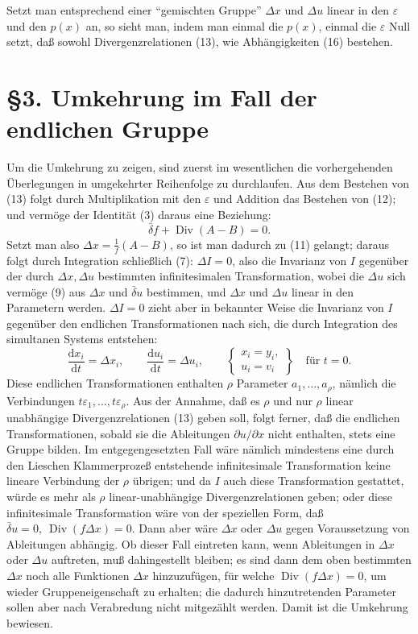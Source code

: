 \documentclass[11pt]{article}
\newcommand{\dd}{\mathrm d}
\newcommand{\Div}{\operatorname{Div}}
\newcommand{\D}{\Delta}
\newcommand{\bd}{\bar{\delta}}
\newcommand{\eps}{\varepsilon}
\newcommand{\p}{\partial}
\begin{document}
Setzt man entsprechend einer ``gemischten Gruppe'' \(\D x\) und \(\D u\) linear in den \(\eps\) und den \(p(x)\) an, so sieht man, indem man einmal die \(p(x)\), einmal die \(\eps\) Null setzt, daß sowohl Divergenzrelationen (13), wie Abhängigkeiten (16) bestehen.

\section*{\S{}3. Umkehrung im Fall der endlichen Gruppe}

Um die Umkehrung zu zeigen, sind zuerst im wesentlichen die vorhergehenden Überlegungen in umgekehrter Reihenfolge zu durchlaufen. Aus dem Bestehen von (13) folgt durch Multiplikation mit den \(\eps\) und Addition das Bestehen von (12); und vermöge der Identität (3) daraus eine Beziehung:
\[
\bd f+\Div(A-B)=0.
\]
Setzt man also \(\D x=\frac{1}{f}(A-B)\), so ist man dadurch zu (11) gelangt; daraus folgt durch Integration schließlich (7): \(\D I=0\), also die Invarianz von \(I\) gegenüber der durch \(\D x,\D u\) bestimmten infinitesimalen Transformation, wobei die \(\D u\) sich vermöge (9) aus \(\D x\) und \(\bd u\) bestimmen, und \(\D x\) und \(\D u\) linear in den Parametern werden. \(\D I=0\) zieht aber in bekannter Weise die Invarianz von \(I\) gegenüber den endlichen Transformationen nach sich, die durch Integration des simultanen Systems entstehen:
\begin{equation}
\frac{\dd x_i}{\dd t}=\D x_i,\qquad
\frac{\dd u_i}{\dd t}=\D u_i,\qquad
\left\{\begin{array}{l}
x_i=y_i,\\
u_i=v_i
\end{array}\right\}
\quad\text{für }t=0.
\tag{17}
\end{equation}
Diese endlichen Transformationen enthalten \(\rho\) Parameter \(a_1,\ldots,a_\rho\), nämlich die Verbindungen \(t\eps_1,\ldots,t\eps_\rho\). Aus der Annahme, daß es \(\rho\) und nur \(\rho\) linear unabhängige Divergenzrelationen (13) geben soll, folgt ferner, daß die endlichen Transformationen, sobald sie die Ableitungen \(\p u/\p x\) nicht enthalten, stets eine Gruppe bilden. Im entgegengesetzten Fall wäre nämlich mindestens eine durch den Lieschen Klammerprozeß entstehende infinitesimale Transformation keine lineare Verbindung der \(\rho\) übrigen; und da \(I\) auch diese Transformation gestattet, würde es mehr als \(\rho\) linear-unabhängige Divergenzrelationen geben; oder diese infinitesimale Transformation wäre von der speziellen Form, daß \(\bd u=0,\ \Div(f\D x)=0\). Dann aber wäre \(\D x\) oder \(\D u\) gegen Voraussetzung von Ableitungen abhängig. Ob dieser Fall eintreten kann, wenn Ableitungen in \(\D x\) oder \(\D u\) auftreten, muß dahingestellt bleiben; es sind dann dem oben bestimmten \(\D x\) noch alle Funktionen \(\D x\) hinzuzufügen, für welche \(\Div(f\D x)=0\), um wieder Gruppeneigenschaft zu erhalten; die dadurch hinzutretenden Parameter sollen aber nach Verabredung nicht mitgezählt werden. Damit ist die Umkehrung bewiesen.
\end{document}
